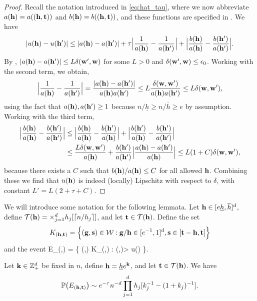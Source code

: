 \documentclass[twoside,11pt]{article}
\begin{document}
\begin{proof}
Recall the notation introduced in \eqref{eq:hat_tau}, where we now abbreviate $a(\mathbf{h}) = a((\mathbf{h},\mathbf{t}))$ and $b(\mathbf{h}) = b((\mathbf{h},\mathbf{t}))$, and these functions are specified in .  We have
\[
|u(\mathbf{h}) - u(\mathbf{h}')| \le |a(\mathbf{h}) - a(\mathbf{h}')| + \tau \Big| \frac{1}{a(\mathbf{h})} - \frac{1}{a(\mathbf{h}')} \Big| + \Big| \frac{b(\mathbf{h})}{a(\mathbf{h})} - \frac{b(\mathbf{h}')}{a(\mathbf{h}')} \Big|.
\]
By , $|a(\mathbf{h}) - a(\mathbf{h}') | \le L \delta(\mathbf{w}',\mathbf{w})$ for some $L > 0$ and $\delta(\mathbf{w}',\mathbf{w}) \le \epsilon_0$.
Working with the second term, we obtain,
\[
\Big| \frac{1}{a(\mathbf{h})} - \frac{1}{a(\mathbf{h}')} \Big| = \frac{|a(\mathbf{h}) - a(\mathbf{h}')|}{a(\mathbf{h})a(\mathbf{h}')} \le L \frac{\delta(\mathbf{w},\mathbf{w}')}{a(\mathbf{h})a(\mathbf{h}')} \le L \delta(\mathbf{w},\mathbf{w}'),
\]
using the fact that $a(\mathbf{h}), a(\mathbf{h}') \ge 1$ because $n/\underline h \ge n / \overline h \ge e$ by assumption.
Working with the third term,
\[
\begin{split}
\Big| \frac{b(\mathbf{h})}{a(\mathbf{h})} - \frac{b(\mathbf{h}')}{a(\mathbf{h}')} \Big| 
&\le \Big| \frac{b(\mathbf{h})}{a(\mathbf{h})} - \frac{b(\mathbf{h}')}{a(\mathbf{h})} \Big| + \Big| \frac{b(\mathbf{h}')}{a(\mathbf{h})} - \frac{b(\mathbf{h}')}{a(\mathbf{h}')} \Big| \\
&\le \frac{L \delta(\mathbf{w},\mathbf{w}')}{a(\mathbf{h})} + \frac{b(\mathbf{h}')}{a(\mathbf{h}')} \Big| \frac{a(\mathbf{h}) - a(\mathbf{h}')}{a(\mathbf{h})} \Big| \le L (1 + C) \delta(\mathbf{w},\mathbf{w}'),
\end{split}
\]
because there exists a $C$ such that $b(\mathbf{h})/a(\mathbf{h}) \le C$ for all allowed $\mathbf{h}$. 
Combining these we find that $u(\mathbf{h})$ is indeed (locally) Lipschitz with respect to $\delta$, with constant $L' = L (2 + \tau + C)$.
\end{proof}


We will introduce some notation for the following lemmata.
Let $\mathbf{h} \in [e \underline h, \overline h]^d$, define ${\mathcal{T}}(\mathbf{h}) = \times_{j=1}^d h_j [\lceil n / h_j \rceil]$, and let $\mathbf{t} \in {\mathcal{T}}(\mathbf{h})$.
Define the set
\[
K_{(\mathbf{h},\mathbf{t})} = \Big\{ (\mathbf{g},\mathbf{s}) \in \mathcal{W} : \mathbf{g}/\mathbf{h} \in [e^{-1},1]^d, \mathbf{s} \in  [\mathbf{t} - \mathbf{h}, \mathbf{t}] \Big\}
\]
and the event 
\beq \label{Ew-def}
E_{(\hb,\tb)} = \Big\{ \exists (\gb,\sbb) \in K_{(\hb,\tb)} : \Xi(\gb,\sbb)> u(\gb) \Big\}.
\eeq

\begin{lemma}
\label{lem:nonconstant_scan}
Let $\mathbf{k} \in \mathbb{Z}_+^d$ be fixed in $n$, define $\mathbf{h} = \underline h e^{\mathbf{k}}$, and let $\mathbf{t} \in {\mathcal{T}}(\mathbf{h})$.  We have
\[
\mathbb{P} \big( E_{(\mathbf{h},\mathbf{t})} \big) \sim e^{-\tau} n^{-d} \prod_{j=1}^d h_j [k_j^{-1} - (1 + k_j)^{-1}].
\]
\end{lemma}
\end{document}
